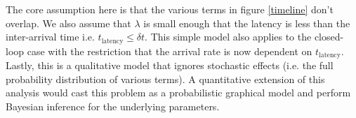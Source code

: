 The core assumption here is that the various terms in figure \ref{timeline} don't overlap. We also assume that $\lambda$ is small enough that the latency is less than the inter-arrival time i.e. $t_{\text{latency}} \leq \delta t$. This simple model also applies to the closed-loop case with the restriction that the arrival rate is now dependent on $t_{\text{latency}}$. Lastly, this is a qualitative model that ignores stochastic effects (i.e. the full probability distribution of various terms). A quantitative extension of this analysis would cast this problem as a probabilistic graphical model and perform Bayesian inference for the underlying parameters.

